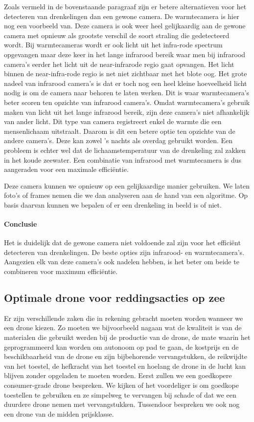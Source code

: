 Zoals vermeld in de bovenstaande paragraaf zijn er betere alternatieven voor het detecteren van drenkelingen dan een gewone camera. De warmtecamera is hier nog een voorbeeld van. Deze camera is ook weer heel gelijkaardig aan de gewone camera met opnieuw als grootste verschil de soort straling die gedetecteerd wordt. Bij warmtecameras wordt er ook licht uit het infra-rode spectrum opgevangen maar deze keer in het lange infrarood bereik waar men bij infrarood camera's eerder het licht uit de near-infrarode regio gaat opvangen. Het licht binnen de near-infra-rode regio is net niet zichtbaar met het blote oog. Het grote nadeel van infrarood camera's is dat er toch nog een heel kleine hoeveelheid licht nodig is om de camera naar behoren te laten werken. Dit is waar warmtecamera's beter scoren ten opzichte van infrarood camera's. Omdat warmtecamera's gebruik maken van licht uit het lange infrarood bereik, zijn deze camera's niet afhankelijk van ander licht. Dit type van camera registreert enkel de warmte die een mensenlichaam uitstraalt. Daarom is dit een betere optie ten opzichte van de andere camera's. Deze kan zowel 's nachts als overdag gebruikt worden. Een probleem is echter wel dat de lichaamstemperatuur van de drenkeling zal zakken in het koude zeewater. Een combinatie van infrarood met warmtecamera is dus aangeraden voor een maximale efficiëntie.

\newpage
Deze camera kunnen we opnieuw op een gelijkaardige manier gebruiken. We laten foto's of frames nemen die we dan analyseren aan de hand van een algoritme. Op basis daarvan kunnen we bepalen of er een drenkeling in beeld is of niet. 

\paragraph{Conclusie}
Het is duidelijk dat de gewone camera niet voldoende zal zijn voor het efficiënt detecteren van drenkelingen. De beste opties zijn infrarood- en warmtecamera's. Aangezien elk van deze camera's ook nadelen hebben, is het beter om beide te combineren voor maximum efficiëntie.

\subsection{Optimale drone voor reddingsacties op zee}

Er zijn verschillende zaken die in rekening gebracht moeten worden wanneer we een drone kiezen. Zo moeten we bijvoorbeeld nagaan wat de kwaliteit is van de materialen die gebruikt werden bij de productie van de drone, de mate waarin het geprogrammeerd kan worden om autonoom op pad te gaan, de kostprijs en de beschikbaarheid van de drone en zijn bijbehorende vervangstukken, de reikwijdte van het toestel, de hefkracht van het toestel en hoelang de drone in de lucht kan blijven zonder opgeladen te moeten worden. Eerst zullen we een goedkopere consumer-grade drone bespreken. We kijken of het voordeliger is om goedkope toestellen te gebruiken en ze simpelweg te vervangen bij schade of dat we een duurdere drone nemen met vervangstukken. Tussendoor bespreken we ook nog een drone van de midden prijsklasse.

